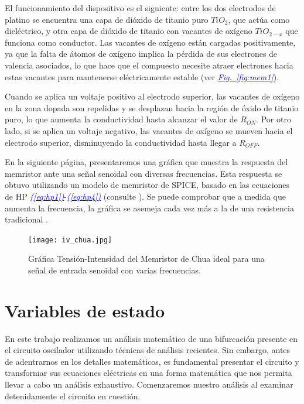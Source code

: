 \documentclass[12pt,a4paper]{report} %
\newcommand{\fref}[1]{\hyperref[#1]{\textcolor{blue}{\textit{Fig.~\ref*{#1}}}}}
\newcommand{\eref}[1]{\hyperref[#1]{\textcolor{blue}{\textit{(\ref*{#1})}}}}
\begin{document}
	\vspace{0.5cm}El funcionamiento del dispositivo es el siguiente: entre los dos electrodos de platino se encuentra una capa de dióxido de titanio puro $TiO_2$, que actúa como dieléctrico, y otra capa de dióxido de titanio con vacantes de oxígeno $TiO_{2-x}$ que funciona como conductor. Las vacantes de oxígeno están cargadas positivamente, ya que la falta de átomos de oxígeno implica la pérdida de sus electrones de valencia asociados, lo que hace que el compuesto necesite atraer electrones hacia estas vacantes para mantenerse eléctricamente estable (ver \fref{fig:mem1}).
	
	\vspace{0.5cm}\noindent Cuando se aplica un voltaje positivo al electrodo superior, las vacantes de oxígeno en la zona dopada son repelidas y se desplazan hacia la región de óxido de titanio puro, lo que aumenta la conductividad hasta alcanzar el valor de $R_{ON}$. Por otro lado, si se aplica un voltaje negativo, las vacantes de oxígeno se mueven hacia el electrodo superior, disminuyendo la conductividad hasta llegar a $R_{OFF}$.

	\vspace{1cm} En la siguiente página, presentaremos una gráfica que muestra la respuesta del memristor ante una señal senoidal con diversas frecuencias. Esta respuesta se obtuvo utilizando un modelo de memristor de SPICE, basado en las ecuaciones de HP \eref{eq:hp1}-\eref{eq:hp4} (consulte \cite{biolek}). Se puede comprobar que a medida que aumenta la frecuencia, la gráfica se asemeja cada vez más a la de una resistencia tradicional \cite{outsiders}.

	\newpage
	
		\begin{figure}[h]
		\centering
		\texttt{[image: iv\_chua.jpg]}
		\caption{Gráfica Tensión-Intensidad del Memristor de Chua ideal para una señal de entrada senoidal con varias frecuencias.}
		\label{fig:iv_chua}
	\end{figure}\smallskip
	
	\newpage
	
	\section{Variables de estado}
	\label{sec:23}
	\noindent En este trabajo realizamos un análisis matemático de una bifurcación presente en el circuito oscilador utilizando técnicas de análisis recientes. Sin embargo, antes de adentrarnos en los detalles matemáticos, es fundamental presentar el circuito y transformar sus ecuaciones eléctricas en una forma matemática que nos permita llevar a cabo un análisis exhaustivo. Comenzaremos nuestro análisis al examinar detenidamente el circuito en cuestión.
	
\end{document}
